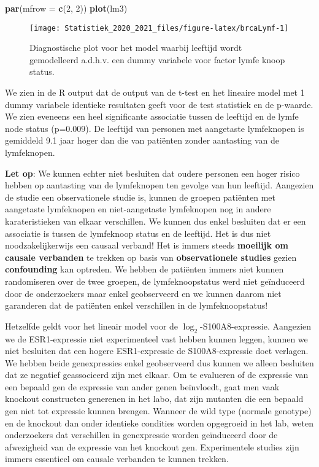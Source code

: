 \documentclass[
  12pt,dutch,coursenotes]{book}
\newenvironment{Shaded}{\begin{snugshade}}{\end{snugshade}}
\newcommand{\DataTypeTok}[1]{\textcolor[rgb]{0.13,0.29,0.53}{#1}}
\newcommand{\DecValTok}[1]{\textcolor[rgb]{0.00,0.00,0.81}{#1}}
\newcommand{\KeywordTok}[1]{\textcolor[rgb]{0.13,0.29,0.53}{\textbf{#1}}}
\newcommand{\NormalTok}[1]{#1}
\theoremstyle{definition}
\theoremstyle{definition}
\theoremstyle{definition}
\theoremstyle{remark}
\begin{document}
\begin{Shaded}
\begin{Highlighting}[]
\KeywordTok{par}\NormalTok{(}\DataTypeTok{mfrow =} \KeywordTok{c}\NormalTok{(}\DecValTok{2}\NormalTok{, }\DecValTok{2}\NormalTok{))}
\KeywordTok{plot}\NormalTok{(lm3)}
\end{Highlighting}
\end{Shaded}

\begin{figure}

{\centering \texttt{[image: Statistiek\_2020\_2021\_files/figure-latex/brcaLymf-1]} 

}

\caption{Diagnostische plot voor het model waarbij leeftijd wordt gemodelleerd a.d.h.v. een dummy variabele voor factor lymfe knoop status.}\label{fig:brcaLymf}
\end{figure}

We zien in de R output dat de output van de t-test en het lineaire model met 1 dummy variabele identieke resultaten geeft voor de test statistiek en de p-waarde.
We zien eveneens een heel significante associatie tussen de leeftijd en de lymfe node status (p=0.009).
De leeftijd van personen met aangetaste lymfeknopen is gemiddeld 9.1 jaar hoger dan die van patiënten zonder aantasting van de lymfeknopen.

\textbf{Let op}: We kunnen echter niet besluiten dat oudere personen een hoger risico hebben op aantasting van de lymfeknopen ten gevolge van hun leeftijd.
Aangezien de studie een observationele studie is, kunnen de groepen patiënten met aangetaste lymfeknopen en niet-aangetaste lymfeknopen nog in andere karateristieken van elkaar verschillen.
We kunnen dus enkel besluiten dat er een associatie is tussen de lymfeknoop status en de leeftijd.
Het is dus niet noodzakelijkerwijs een causaal verband!
Het is immers steeds \textbf{moeilijk om causale verbanden} te trekken op basis van \textbf{observationele studies} gezien \textbf{confounding} kan optreden.
We hebben de patiënten immers niet kunnen randomiseren over de twee groepen, de lymfeknoopstatus werd niet geïnduceerd door de onderzoekers maar enkel geobserveerd en we kunnen daarom niet garanderen dat de patiënten enkel verschillen in de lymfeknoopstatus!

Hetzelfde geldt voor het lineair model voor de \(\log_2\)-S100A8-expressie. Aangezien we de ESR1-expressie niet experimenteel vast hebben kunnen leggen, kunnen we niet besluiten dat een hogere ESR1-expressie de S100A8-expressie doet verlagen. We hebben beide genexpressies enkel geobserveerd dus kunnen we alleen besluiten dat ze negatief geassocieerd zijn met elkaar. Om te evalueren of de expressie van een bepaald gen de expressie van ander genen beïnvloedt, gaat men vaak knockout constructen generenen in het labo, dat zijn mutanten die een bepaald gen niet tot expressie kunnen brengen. Wanneer de wild type (normale genotype) en de knockout dan onder identieke condities worden opgegroeid in het lab, weten onderzoekers dat verschillen in genexpressie worden geïnduceerd door de afwezigheid van de expressie van het knockout gen. Experimentele studies zijn immers essentieel om causale verbanden te kunnen trekken.
\end{document}
